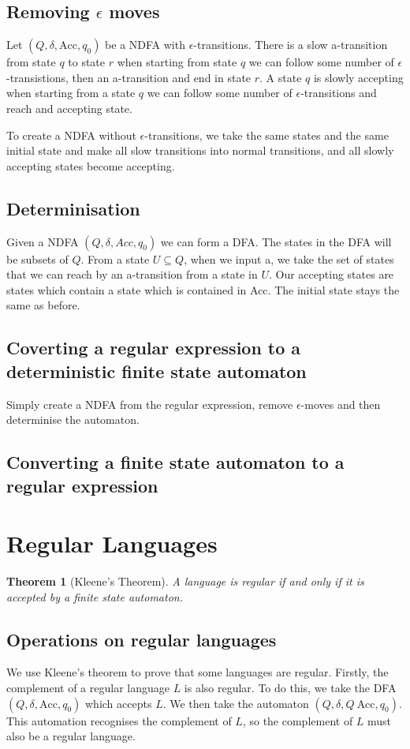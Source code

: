 \documentclass[11pt]{article}
\newtheorem{theorem}{Theorem}
\begin{document}
	\subsection{Removing $\epsilon$ moves}
	Let $(Q, \delta, \text{Acc}, q_{0})$ be a NDFA with $\epsilon$-transitions. There is a slow a-transition from state $q$ to state $r$ when starting from state $q$ we can follow some number of $\epsilon$-transistions, then an a-transition and end in state $r$. A state $q$ is slowly accepting when starting from a state $q$ we can follow some number of $\epsilon$-transitions and reach and accepting state.
	
	\par To create a NDFA without $\epsilon$-transitions, we take the same states and the same initial state and make all slow transitions into normal transitions, and all slowly accepting states become accepting.
	
	\subsection{Determinisation}
	Given a NDFA $(Q, \delta, Acc, q_{0})$ we can form a DFA. The states in the DFA will be subsets of $Q$. From a state $U \subseteq Q$, when we input a, we take the set of states that we can reach by an a-transition from a state in $U$. Our accepting states are states which contain a state which is contained in Acc. The initial state stays the same as before.
	\subsection{Coverting a regular expression to a deterministic finite state automaton}
	Simply create a NDFA from the regular expression, remove $\epsilon$-moves and then determinise the automaton.
	\subsection{Converting a finite state automaton to a regular expression}
	
	\section{Regular Languages}
	\begin{theorem}[Kleene's Theorem]
	A language is regular if and only if it is accepted by a finite state automaton.
	\end{theorem}
	 
	\subsection{Operations on regular languages}
	We use Kleene's theorem to prove that some languages are regular. Firstly, the complement of a regular language $L$ is also regular. To do this, we take the DFA $(Q, \delta, \text{Acc}, q_{0})$ which accepts $L$. We then take the automaton $(Q, \delta, Q\ \text{Acc}, q_{0})$. This automation recognises the complement of $L$, so the complement of $L$ must also be a regular language.
	
\end{document}
